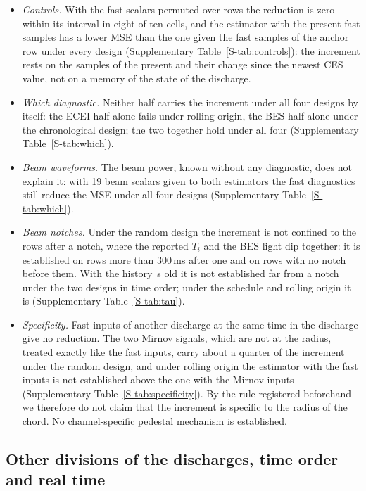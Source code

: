 \documentclass[11pt,a4paper]{article}
\newcommand{\Ti}{\ensuremath{T_i}}
\newcommand{\SuppTab}[1]{Supplementary Table~\ref{S-#1}}
\begin{document}
\begin{itemize}\setlength{\itemsep}{1pt}\setlength{\parskip}{0pt}
\item \emph{Controls.} With the fast scalars permuted over rows the reduction is zero within its interval in eight of ten cells, and the estimator with the present fast samples has a lower MSE than the one given the fast samples of the anchor row under every design (\SuppTab{tab:controls}): the increment rests on the samples of the present and their change since the newest CES value, not on a memory of the state of the discharge.
\item \emph{Which diagnostic.} Neither half carries the increment under all four designs by itself: the ECEI half alone fails under rolling origin, the BES half alone under the chronological design; the two together hold under all four (\SuppTab{tab:which}).
\item \emph{Beam waveforms.} The beam power, known without any diagnostic, does not explain it: with 19 beam scalars given to both estimators the fast diagnostics still reduce the MSE under all four designs (\SuppTab{tab:which}).
\item \emph{Beam notches.} Under the random design the increment is not confined to the rows after a notch, where the reported \Ti{} and the BES light dip together: it is established on rows more than 300\,ms after one and on rows with no notch before them. With the history \AgeMedianS\,s old it is not established far from a notch under the two designs in time order; under the schedule and rolling origin it is (\SuppTab{tab:tau}).
\item \emph{Specificity.} Fast inputs of another discharge at the same time in the discharge give no reduction. The two Mirnov signals, which are not at the radius, treated exactly like the fast inputs, carry about a quarter of the increment under the random design, and under rolling origin the estimator with the fast inputs is not established above the one with the Mirnov inputs (\SuppTab{tab:specificity}). By the rule registered beforehand we therefore do not claim that the increment is specific to the radius of the chord. No channel-specific pedestal mechanism is established.
\end{itemize}

\subsection{Other divisions of the discharges, time order and real time}
\label{sec:res:designs}
\end{document}
